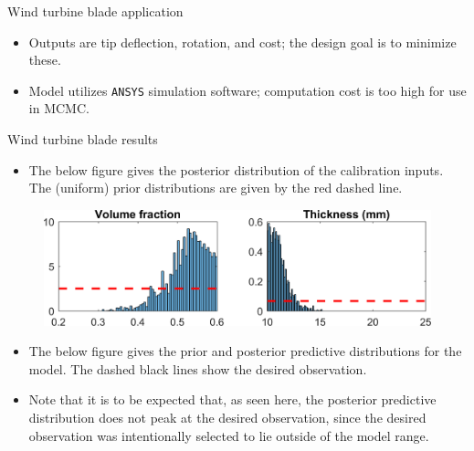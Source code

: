 \documentclass[final]{beamer}
\newlength{\onecolwid}
\newlength{\twocolwid}
\begin{document}
\begin{frame}[t]
\begin{columns}[t]
\begin{column}{\twocolwid}
\begin{columns}[t,totalwidth=\twocolwid]
\begin{column}{\onecolwid}
\begin{alertblock}{Wind turbine blade application}
\begin{itemize}

\item Outputs are tip deflection, rotation, and cost; the design goal is to minimize these.

\item Model utilizes \texttt{ANSYS} simulation software; computation cost is too high for use in MCMC.


\end{itemize}
\end{alertblock}

\begin{alertblock}{Wind turbine blade results}

\begin{itemize}
\item The below figure gives the posterior distribution of the calibration inputs. The (uniform) prior distributions are given by the red dashed line.
\end{itemize}

\vspace{-5mm}
\begin{figure}[h!]
\includegraphics[width=.975\linewidth]{FIG_posterior_marginals_with_priors}
\label{blade}
\end{figure}

\vspace{-8mm}
\begin{itemize}
\item The below figure gives the prior and posterior predictive distributions for the model. The dashed black lines show the desired observation.
\item Note that it is to be expected that, as seen here, the posterior predictive distribution does not peak at the desired observation, since the desired observation was intentionally selected to lie outside of the model range.
\end{itemize}


\end{alertblock}
\end{column}
\end{columns}
\end{column}
\end{columns}
\end{frame}
\end{document}
